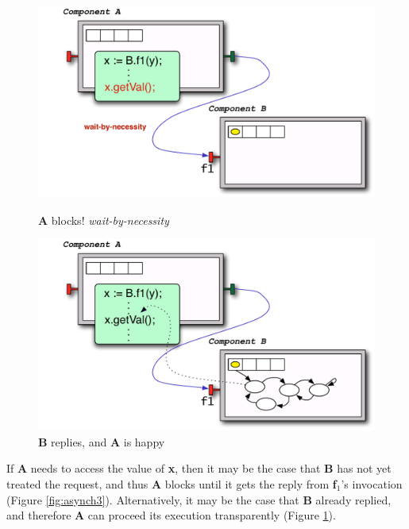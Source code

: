 	\begin{figure}[H]
	\begin{minipage}[b]{0.5\linewidth} 
	\includegraphics[width=\textwidth]{figures/chapter2/asynch3.pdf}
	\caption{\textbf{A} blocks! \textit{wait-by-necessity}}
	\label{fig:asynch3}
	\end{minipage}
	\begin{minipage}[b]{0.5\linewidth} 
	\includegraphics[width=\textwidth]{figures/chapter2/asynch4.pdf}
	\caption{\textbf{B} replies, and \textbf{A} is happy}
	\label{fig:asynch4}
	\end{minipage}
	\end{figure}	 	
	
	
	\noindent If \textbf{A} needs to access the value of \textbf{x}, then it may be the
	case that \textbf{B} has not yet treated the request, and thus \textbf{A} blocks
	until it gets the reply from \textbf{f$_1$}'s invocation (Figure \ref{fig:asynch3}).
	Alternatively, it may be the case that \textbf{B} already replied,
	and therefore \textbf{A} can proceed its execution transparently (Figure \ref{fig:asynch4}).
	
